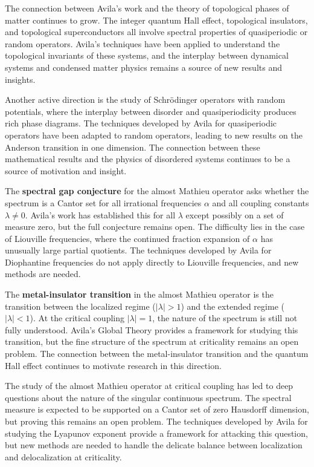The connection between Avila's work and the theory of topological phases of matter continues to grow. The integer quantum Hall effect, topological insulators, and topological superconductors all involve spectral properties of quasiperiodic or random operators. Avila's techniques have been applied to understand the topological invariants of these systems, and the interplay between dynamical systems and condensed matter physics remains a source of new results and insights.

Another active direction is the study of Schr\"{o}dinger operators with random potentials, where the interplay between disorder and quasiperiodicity produces rich phase diagrams. The techniques developed by Avila for quasiperiodic operators have been adapted to random operators, leading to new results on the Anderson transition in one dimension. The connection between these mathematical results and the physics of disordered systems continues to be a source of motivation and insight.

The \textbf{spectral gap conjecture} for the almost Mathieu operator asks whether the spectrum is a Cantor set for all irrational frequencies $\alpha$ and all coupling constants $\lambda \ne 0$. Avila's work has established this for all $\lambda$ except possibly on a set of measure zero, but the full conjecture remains open. The difficulty lies in the case of Liouville frequencies, where the continued fraction expansion of $\alpha$ has unusually large partial quotients. The techniques developed by Avila for Diophantine frequencies do not apply directly to Liouville frequencies, and new methods are needed.

The \textbf{metal-insulator transition} in the almost Mathieu operator is the transition between the localized regime ($|\lambda|>1$) and the extended regime ($|\lambda|<1$). At the critical coupling $|\lambda|=1$, the nature of the spectrum is still not fully understood. Avila's Global Theory provides a framework for studying this transition, but the fine structure of the spectrum at criticality remains an open problem. The connection between the metal-insulator transition and the quantum Hall effect continues to motivate research in this direction.

The study of the almost Mathieu operator at critical coupling has led to deep questions about the nature of the singular continuous spectrum. The spectral measure is expected to be supported on a Cantor set of zero Hausdorff dimension, but proving this remains an open problem. The techniques developed by Avila for studying the Lyapunov exponent provide a framework for attacking this question, but new methods are needed to handle the delicate balance between localization and delocalization at criticality.

